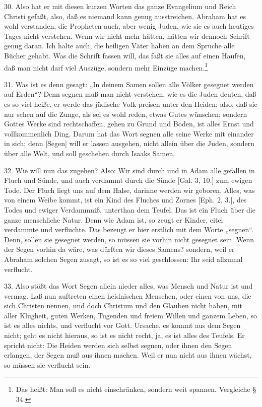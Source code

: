 30. Also hat er mit diesen kurzen Worten das ganze Evangelium und Reich Christi gefaßt, also, daß es niemand kann genug ausstreichen. Abraham hat es wohl verstanden, die Propheten auch, aber wenig Juden, wie sie es auch heutiges Tages nicht verstehen. Wenn wir nicht mehr hätten, hätten wir dennoch Schrift genug daran. Ich halte auch, die heiligen Väter haben an dem Spruche alle Bücher gehabt. Was die Schrift fassen will, das faßt sie alles auf einen Haufen,
daß man nicht darf viel Auszüge, sondern mehr Einzüge machen.\footnote{Das heißt: Man soll es nicht einschränken, sondern weit spannen. Vergleiche § 34.}

31. Was ist es denn gesagt: „In deinem Samen sollen alle Völker gesegnet werden auf Erden“? Denn segnen muß man nicht verstehen, wie es die Juden deuten, daß es so viel heiße, er werde das jüdische Volk preisen unter den Heiden; also, daß sie nur sehen auf die Zunge, als sei es wohl reden, etwas Gutes wünschen; sondern Gottes Werke sind rechtschaffen, gehen zu Grund und Boden, ist alles Ernst und vollkommenlich Ding. Darum hat das Wort segnen alle seine Werke mit einander in sich; denn [Segen] will er lassen ausgehen, nicht allein über die Juden, sondern über alle Welt, und soll geschehen durch Isaaks Samen.

32. Wie will nun das zugehen? Also: Wir sind durch und in Adam alle gefallen in Fluch und Sünde, und auch verdammt durch die Sünde [Gal. 3, 10.] zum ewigen Tode. Der Fluch liegt uns auf dem Halse, darinne werden wir geboren. Alles, was von einem Weibe kommt, ist ein Kind des Fluches und Zornes [Eph. 2, 3.], des Todes und ewiger Verdammniß, unterthan dem Teufel. Das ist ein Fluch über die ganze menschliche Natur. Denn wie Adam ist, so zeugt er Kinder, eitel verdammte und verfluchte. Das bezeugt er hier erstlich mit dem Worte „segnen“. Denn, sollen sie gesegnet werden, so müssen sie vorhin nicht gesegnet sein. Wenn der Segen vorhin da wäre, was dürften wir dieses Samens? sondern, weil er Abraham solchen Segen zusagt, so ist es so viel geschlossen: Ihr seid allzumal verflucht.

33. Also stößt das Wort Segen allein nieder alles, was Mensch und Natur ist und vermag. Laß nun auftreten einen heidnischen Menschen, oder einen von uns, die sich Christen nennen, und doch Christum und den Glauben nicht haben, mit aller Klugheit, guten Werken, Tugenden und freiem Willen und ganzem Leben, so ist es alles nichts, und verflucht vor Gott. Ursache, es kommt aus dem Segen nicht; geht es nicht hieraus, so ist es nicht recht, ja, es ist alles des Teufels. Er spricht nicht: Die Heiden werden sich selbst segnen, oder ihnen den Segen erlangen, der Segen muß aus ihnen machen. Weil er nun nicht aus ihnen wächst, so müssen sie verflucht sein.

